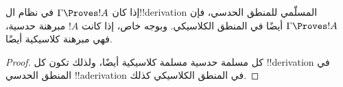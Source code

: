 \documentclass[../../../include/open-logic-section]{subfiles}
\begin{document}
\begin{prop}
  إذا كان $\Gamma \Proves !A$ في نظام ال!!{derivation} المسلّمي
  للمنطق الحدسي، فإن $\Gamma \Proves !A$ أيضًا في المنطق الكلاسيكي.
  وبوجه خاص، إذا كانت $!A$ مبرهنة حدسية، فهي مبرهنة كلاسيكية أيضًا.
\end{prop}

\begin{proof}
  كل مسلمة حدسية مسلمة كلاسيكية أيضًا، ولذلك تكون كل !!{derivation}
  في المنطق الحدسي !!a{derivation} في المنطق الكلاسيكي كذلك.
\end{proof}
\end{document}

